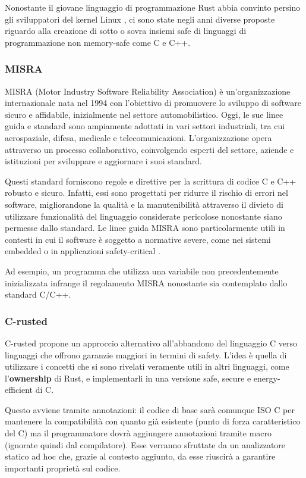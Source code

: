 Nonostante il giovane linguaggio di programmazione Rust abbia convinto persino gli sviluppatori del kernel Linux \cite{RustInKernel}, ci sono state negli anni diverse proposte riguardo alla creazione di sotto o sovra insiemi safe di linguaggi di programmazione non memory-safe come C e C++.

\subsubsection{MISRA}
MISRA (Motor Industry Software Reliability Association) è un'organizzazione internazionale nata nel 1994 con l'obiettivo di promuovere lo sviluppo di software sicuro e affidabile, inizialmente nel settore automobilistico. Oggi, le sue linee guida e standard sono ampiamente adottati in vari settori industriali, tra cui aerospaziale, difesa, medicale e telecomunicazioni. L'organizzazione opera attraverso un processo collaborativo, coinvolgendo esperti del settore, aziende e istituzioni per sviluppare e aggiornare i suoi standard.

Questi standard forniscono regole e direttive per la scrittura di codice C e C++ robusto e sicuro. Infatti, essi sono progettati per ridurre il rischio di errori nel software, migliorandone la qualità e la manutenibilità attraverso il divieto di utilizzare funzionalità del linguaggio considerate pericolose nonostante siano permesse dallo standard. Le linee guida MISRA sono particolarmente utili in contesti in cui il software è soggetto a normative severe, come nei sistemi embedded o in applicazioni safety-critical \cite{MISRA}. 

Ad esempio, un programma che utilizza una variabile non precedentemente inizializzata infrange il regolamento MISRA nonostante sia contemplato dallo standard C/C++.

\subsubsection{C-rusted}
C-rusted propone un approccio alternativo all'abbandono del linguaggio C verso linguaggi che offrono garanzie maggiori in termini di safety. L'idea è quella di utilizzare i concetti che si sono rivelati veramente utili in altri linguaggi, come l'\textbf{ownership} di Rust, e implementarli in una versione safe, secure e energy-efficient di C.

Questo avviene tramite annotazioni: il codice di base sarà comunque ISO C per mantenere la compatibilità con quanto già esistente (punto di forza caratteristico del C) ma il programmatore dovrà aggiungere annotazioni tramite macro (ignorate quindi dal compilatore). Esse verranno sfruttate da un analizzatore statico ad hoc che, grazie al contesto aggiunto, da esse riuscirà a garantire importanti proprietà sul codice.


